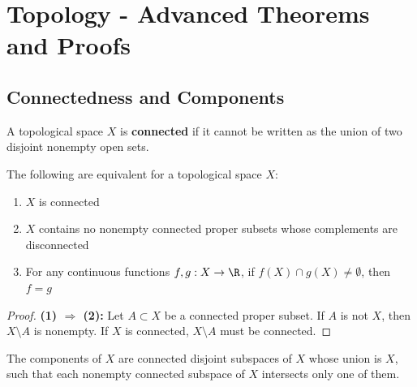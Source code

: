 \chapter{Topology - Advanced Theorems and Proofs}
\label{ch:topology-advanced}

\section{Connectedness and Components}
\label{sec:topology-connectedness}

A topological space $X$ is \textbf{connected} if it cannot be written as the union of two disjoint nonempty open sets.

\begin{theorem}
\label{thm:equivalences-connectedness}
The following are equivalent for a topological space $X$:
\begin{enumerate}
\item $X$ is connected
\item $X$ contains no nonempty connected proper subsets whose complements are disconnected
\item For any continuous functions $f, g: X \to \R$, if $f(X) \cap g(X) \neq \emptyset$, then $f = g$
\end{enumerate}
\end{theorem}

\begin{proof}
\textbf{(1) $\Rightarrow$ (2):} Let $A \subset X$ be a connected proper subset. If $A$ is not $X$, then $X \setminus A$ is nonempty. If $X$ is connected, $X \setminus A$ must be connected.
\end{proof}

\begin{theorem}
\label{thm:components-theorem}
The components of $X$ are connected disjoint subspaces of $X$ whose union is $X$, such that each nonempty connected subspace of $X$ intersects only one of them.
\end{theorem}

